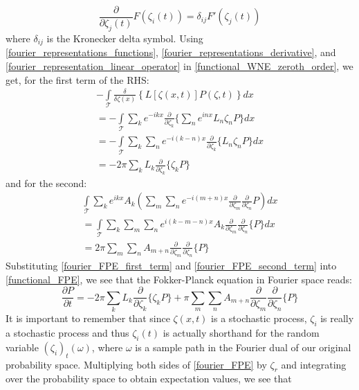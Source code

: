 \begin{equation}
\label{fourier_mode_relation}
\frac{\partial}{\partial \zeta_j(t)}F(\zeta_i(t)) = \delta_{ij}F'(\zeta_j(t))
\end{equation}
where $\delta_{ij}$ is the Kronecker delta symbol.
Using \eqref{fourier_representations_functions}, \eqref{fourier_representations_derivative}, and \eqref{fourier_representation_linear_operator} in \eqref{functional_WNE_zeroth_order}, we get, for the first term of the RHS:
\begin{gather}
-\int\limits_{\mathcal{T}}\frac{\delta}{\delta \zeta(x)}\left\{L[\zeta(x,t)]P(\zeta,t)\right\}dx\nonumber\\
= -\int\limits_{\mathcal{T}}\sum\limits_{k}e^{-ikx}\frac{\partial}{\partial \zeta_k}\{\sum\limits_{n}e^{inx}L_n\zeta_nP\}dx\nonumber\\
= -\int\limits_{\mathcal{T}}\sum\limits_{k}\sum\limits_{n}e^{-i(k-n)x}\frac{\partial}{\partial \zeta_k}\{L_n\zeta_nP\}dx\nonumber\\
= -2\pi\sum\limits_{k}L_{k}\frac{\partial}{\partial \zeta_k}\{\zeta_kP\}\label{fourier_FPE_first_term}
\end{gather}
and for the second:
\begin{gather}
\int\limits_{\mathcal{T}}\sum\limits_{k}e^{ikx}A_k\left(\sum\limits_{m}\sum\limits_{n}e^{-i(m+n)x}\frac{\partial}{\partial \zeta_m}\frac{\partial}{\partial \zeta_n}P\right)dx\nonumber\\
= \int\limits_{\mathcal{T}}\sum\limits_{k}\sum\limits_{m}\sum\limits_{n}e^{i(k-m-n)x}A_k\frac{\partial}{\partial \zeta_m}\frac{\partial}{\partial \zeta_n}\{P\}dx\nonumber\\
= 2\pi\sum\limits_{m}\sum\limits_{n}A_{m+n}\frac{\partial}{\partial \zeta_m}\frac{\partial}{\partial \zeta_{n}}\{P\}\label{fourier_FPE_second_term}
\end{gather}
Substituting \eqref{fourier_FPE_first_term} and \eqref{fourier_FPE_second_term} into \eqref{functional_FPE}, we see that the Fokker-Planck equation in Fourier space reads:
\begin{equation}
\label{fourier_FPE}
\frac{\partial P}{\partial t} = -2\pi\sum\limits_{k}L_{k}\frac{\partial}{\partial \zeta_k}\{\zeta_kP\} + \pi\sum\limits_{m}\sum\limits_{n}A_{m+n}\frac{\partial}{\partial \zeta_m}\frac{\partial}{\partial \zeta_{n}}\{P\}
\end{equation}
It is important to remember that since $\zeta(x,t)$ is a stochastic process, $\zeta_i$ is really a stochastic process and thus $\zeta_i(t)$ is actually shorthand for the random variable $(\zeta_i)_{t}(\omega)$, where $\omega$ is a sample path in the Fourier dual of our original probability space. Multiplying both sides of \eqref{fourier_FPE} by $\zeta_r$ and integrating over the probability space to obtain expectation values, we see that
